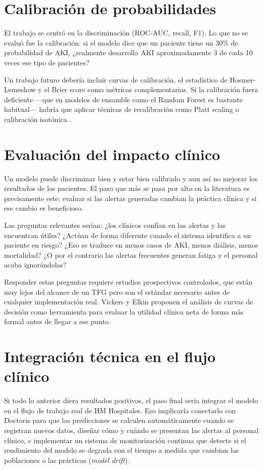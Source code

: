 \documentclass[12pt, a4paper, oneside]{report}
\begin{document}
\section{Calibración de probabilidades}

El trabajo se centró en la discriminación (ROC-AUC, recall, F1). Lo que no se evaluó fue la calibración: si el modelo dice que un paciente tiene un 30\% de probabilidad de AKI, ¿realmente desarrolla AKI aproximadamente 3 de cada 10 veces ese tipo de pacientes?

Un trabajo futuro debería incluir curvas de calibración, el estadístico de Hosmer-Lemeshow y el Brier score como métricas complementarias. Si la calibración fuera deficiente —que en modelos de ensamble como el Random Forest es bastante habitual— habría que aplicar técnicas de recalibración como Platt scaling o calibración isotónica \parencite{niculescu2005predicting}.

\section{Evaluación del impacto clínico}

Un modelo puede discriminar bien y estar bien calibrado y aun así no mejorar los resultados de los pacientes. El paso que más se pasa por alto en la literatura es precisamente este: evaluar si las alertas generadas cambian la práctica clínica y si ese cambio es beneficioso.

Las preguntas relevantes serían: ¿los clínicos confían en las alertas y las encuentran útiles? ¿Actúan de forma diferente cuando el sistema identifica a un paciente en riesgo? ¿Eso se traduce en menos casos de AKI, menos diálisis, menos mortalidad? ¿O por el contrario las alertas frecuentes generan fatiga y el personal acaba ignorándolas?

Responder estas preguntas requiere estudios prospectivos controlados, que están muy lejos del alcance de un TFG pero son el estándar necesario antes de cualquier implementación real. Vickers y Elkin \parencite{vickers2006decision} proponen el análisis de curvas de decisión como herramienta para evaluar la utilidad clínica neta de forma más formal antes de llegar a ese punto.

\section{Integración técnica en el flujo clínico}

Si todo lo anterior diera resultados positivos, el paso final sería integrar el modelo en el flujo de trabajo real de HM Hospitales. Eso implicaría conectarlo con Doctoris para que las predicciones se calculen automáticamente cuando se registran nuevos datos, diseñar cómo y cuándo se presentan las alertas al personal clínico, e implementar un sistema de monitorización continua que detecte si el rendimiento del modelo se degrada con el tiempo a medida que cambian las poblaciones o las prácticas (\textit{model drift}).
\end{document}

